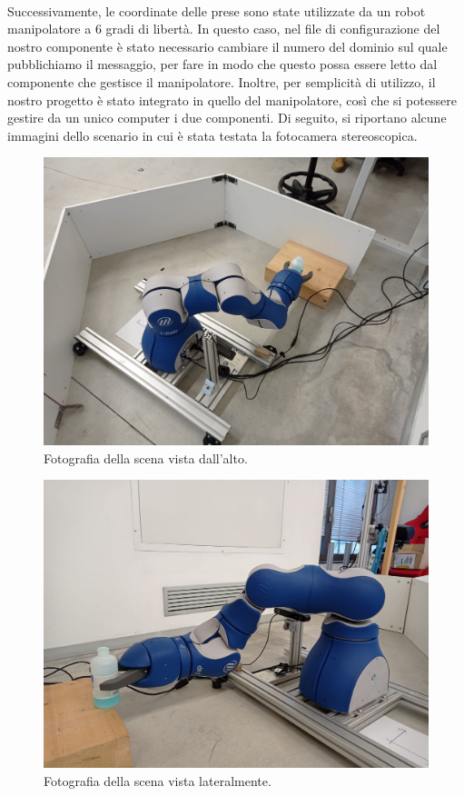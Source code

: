 \documentclass{report}
\begin{document}
\\Successivamente, le coordinate delle prese sono state utilizzate da un robot manipolatore a 6 gradi di libertà. In questo caso, nel file di configurazione del nostro componente è stato necessario cambiare il numero del dominio sul quale pubblichiamo il messaggio, per fare in modo che questo possa essere letto dal componente che gestisce il manipolatore. Inoltre, per semplicità di utilizzo, il nostro progetto è stato integrato in quello del manipolatore, così che si potessere gestire da un unico computer i due componenti. Di seguito, si riportano alcune immagini dello scenario in cui è stata testata la fotocamera stereoscopica.
\begin{figure}[h!]
	\centering
	\includegraphics[width=\textwidth]{immagini/manipAlto}
	\caption{Fotografia della scena vista dall'alto.}
	\label{figura:manipAlto}
\end{figure}
\begin{figure}[h!]
	\centering
	\includegraphics[width=\textwidth]{immagini/manipDavanti1}
	\caption{Fotografia della scena vista lateralmente.}
	\label{figura:manipDavanti}
\end{figure}
\end{document}
